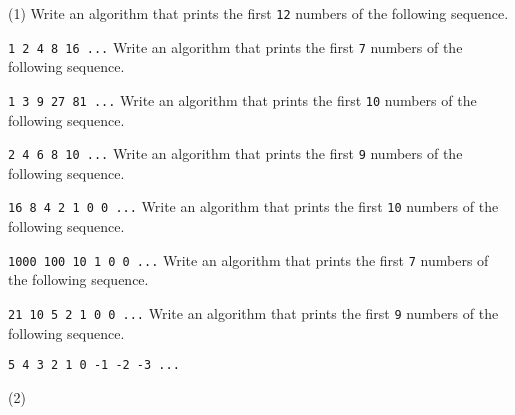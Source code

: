 \begin{exercise}
    \begin{longtasks}[resume=true](1)
        \task
        Write an algorithm that prints the first \texttt{12} numbers of the following sequence.

        \texttt{1 2 4 8 16 ...}
        \task
        Write an algorithm that prints the first \texttt{7} numbers of the following sequence.

        \texttt{1 3 9 27 81 ...}
        \task
        Write an algorithm that prints the first \texttt{10} numbers of the following sequence.

        \texttt{2 4 6 8 10 ...}
        \task
        Write an algorithm that prints the first \texttt{9} numbers of the following sequence.

        \texttt{16 8 4 2 1 0 0 ...}
        \task
        Write an algorithm that prints the first \texttt{10} numbers of the following sequence.

        \texttt{1000 100 10 1 0 0 ...}
        \task
        Write an algorithm that prints the first \texttt{7} numbers of the following sequence.

        \texttt{21 10 5 2 1 0 0 ...}
        \task
        Write an algorithm that prints the first \texttt{9} numbers of the following sequence.

        \texttt{5 4 3 2 1 0 -1 -2 -3 ...}
    \end{longtasks}
\end{exercise}

\begin{solution}
    \begin{mltasks}(2)
        \task {}
        \task {}
        \task {}
        \task {}
        \task {}
        \task {}
    \end{mltasks}
\end{solution}
